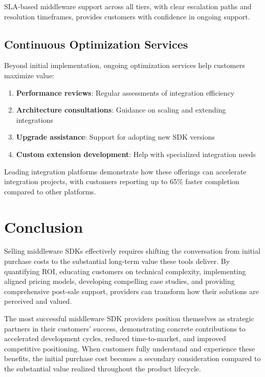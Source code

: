 \documentclass[11pt,a4paper]{article}
\begin{document}
SLA-based middleware support across all tiers, with clear escalation paths and resolution timeframes, provides customers with confidence in ongoing support.

\subsection{Continuous Optimization Services}

Beyond initial implementation, ongoing optimization services help customers maximize value:

\begin{enumerate}
    \item \textbf{Performance reviews}: Regular assessments of integration efficiency
    \item \textbf{Architecture consultations}: Guidance on scaling and extending integrations
    \item \textbf{Upgrade assistance}: Support for adopting new SDK versions
    \item \textbf{Custom extension development}: Help with specialized integration needs
\end{enumerate}

Leading integration platforms demonstrate how these offerings can accelerate integration projects, with customers reporting up to 65\% faster completion compared to other platforms.

\section{Conclusion}

Selling middleware SDKs effectively requires shifting the conversation from initial purchase costs to the substantial long-term value these tools deliver. By quantifying ROI, educating customers on technical complexity, implementing aligned pricing models, developing compelling case studies, and providing comprehensive post-sale support, providers can transform how their solutions are perceived and valued.

The most successful middleware SDK providers position themselves as strategic partners in their customers' success, demonstrating concrete contributions to accelerated development cycles, reduced time-to-market, and improved competitive positioning. When customers fully understand and experience these benefits, the initial purchase cost becomes a secondary consideration compared to the substantial value realized throughout the product lifecycle.
\end{document}
